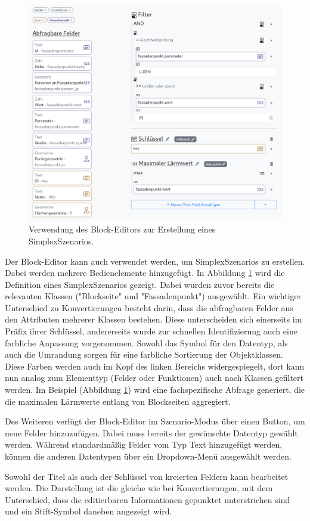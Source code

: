 \begin{figure}[ht]
  \begin{center}
    \includegraphics[width=.95\textwidth]{assets/lpz-scenario.png}
  \end{center}
  \caption{Verwendung des Block-Editors zur Erstellung eines SimplexSzenarios.}
  \label{fig:buffet-scenario}
\end{figure}

Der Block-Editor kann auch verwendet werden, um SimplexSzenarios zu erstellen. Dabei werden mehrere Bedienelemente hinzugefügt. In Abbildung \ref{fig:buffet-scenario} wird die Definition eines SimplexSzenarios gezeigt. Dabei wurden zuvor bereits die relevanten Klassen ("Blockseite" und "Fassadenpunkt") ausgewählt. Ein wichtiger Unterschied zu Konvertierungen besteht darin, dass die abfragbaren Felder aus den Attributen mehrerer Klassen bestehen. Diese unterscheiden sich einerseits im Präfix ihrer Schlüssel, andererseits wurde zur schnellen Identifizierung auch eine farbliche Anpassung vorgenommen. Sowohl das Symbol für den Datentyp, als auch die Umrandung sorgen für eine farbliche Sortierung der Objektklassen. Diese Farben werden auch im Kopf des linken Bereichs widergespiegelt, dort kann nun analog zum Elementtyp (Felder oder Funktionen) auch nach Klassen gefiltert werden. Im Beispiel (Abbildung \ref{fig:buffet-scenario}) wird eine fachspezifische Abfrage generiert, die die maximalen Lärmwerte entlang von Blockseiten aggregiert.

Des Weiteren verfügt der Block-Editor im Szenario-Modus über einen Button, um neue Felder hinzuzufügen. Dabei muss bereits der gewünschte Datentyp gewählt werden. Während standardmäßig Felder vom Typ Text hinzugefügt werden, können die anderen Datentypen über ein Dropdown-Menü ausgewählt werden.

Sowohl der Titel als auch der Schlüssel von kreierten Feldern kann bearbeitet werden. Die Darstellung ist die gleiche wie bei Konvertierungen, mit dem Unterschied, dass die editierbaren Informationen gepunktet unterstrichen sind und ein Stift-Symbol daneben angezeigt wird.
